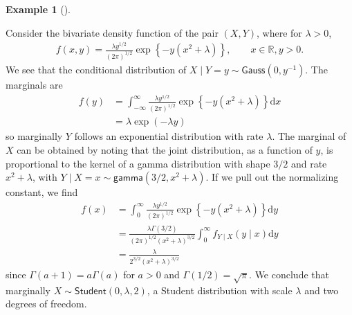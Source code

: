 \documentclass[
  11pt,
  letterpaper,
]{scrbook}
\theoremstyle{definition}
\theoremstyle{plain}
\theoremstyle{plain}
\theoremstyle{definition}
\newtheorem{example}{Example}[chapter]
\theoremstyle{definition}
\theoremstyle{remark}
\begin{document}
\begin{example}[]\protect\hypertarget{exm-conditional-marginal}{}\label{exm-conditional-marginal}

Consider the bivariate density function of the pair \((X, Y)\), where
for \(\lambda>0\), \begin{align*}
f(x,y) = \frac{\lambda y^{1/2}}{(2\pi)^{1/2}}\exp\left\{ - y(x^2 + \lambda)\right\}, \qquad x \in \mathbb{R}, y>0.
\end{align*} We see that the conditional distribution of
\(X \mid Y=y \sim \mathsf{Gauss}(0, y^{-1})\). The marginals are
\begin{align*}
f(y) &= \int_{-\infty}^\infty \frac{\lambda y^{1/2}}{(2\pi)^{1/2}}\exp\left\{ - y(x^2 + \lambda)\right\} \mathrm{d} x
\\&= \lambda \exp(-\lambda y)
\end{align*} so marginally \(Y\) follows an exponential distribution
with rate \(\lambda\). The marginal of \(X\) can be obtained by noting
that the joint distribution, as a function of \(y\), is proportional to
the kernel of a gamma distribution with shape \(3/2\) and rate
\(x^2+\lambda\), with
\(Y \mid X=x \sim \mathsf{gamma}(3/2, x^2+\lambda)\). If we pull out the
normalizing constant, we find \begin{align*}
f(x) &= \int_{0}^{\infty} \frac{\lambda y^{1/2}}{(2\pi)^{1/2}}\exp\left\{ - y(x^2 + \lambda)\right\} \mathrm{d} y\\&=
\frac{\lambda \Gamma(3/2)}{(2\pi)^{1/2}(x^2+\lambda)^{3/2}} \int_0^\infty f_{Y \mid X}(y \mid x) \mathrm{d} y \\ &= \frac{\lambda}{2^{3/2}(x^2+\lambda)^{3/2}}
\end{align*} since \(\Gamma(a+1) = a\Gamma(a)\) for \(a>0\) and
\(\Gamma(1/2) = \sqrt{\pi}\). We conclude that marginally
\(X \sim \mathsf{Student}(0, \lambda, 2)\), a Student distribution with
scale \(\lambda\) and two degrees of freedom.

\end{example}
\end{document}
